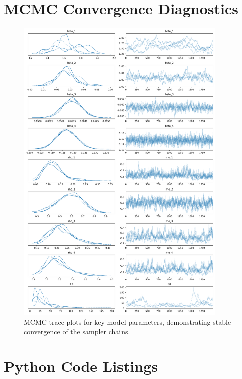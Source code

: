 \documentclass[12pt, a4paper]{article}
\begin{document}
\clearpage
\appendix
\section{MCMC Convergence Diagnostics}
\begin{figure}[H]
    \centering
    \includegraphics[width=0.90\textwidth]{1/bayesian_trace_plots.png}
    \caption{MCMC trace plots for key model parameters, demonstrating stable convergence of the sampler chains.}
    \label{fig:trace_plots}
\end{figure}

\section{Python Code Listings}
\end{document}
